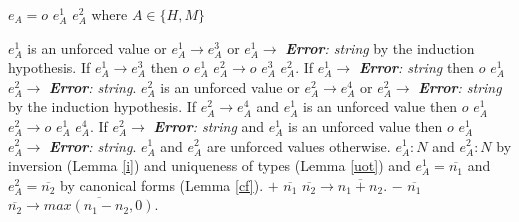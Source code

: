 \begin{case}

$e_{A}=o$ $e_{A}^{1}$ $e_{A}^{2}$ where $A\in\lbrace H,M\rbrace$

$e_{A}^{1}$ is an unforced value or $e_{A}^{1}\rightarrow e_{A}^{3}$ or $e_{A}^{1}\rightarrow$ \emph{\textbf{Error}: string} by the induction hypothesis.  If $e_{A}^{1}\rightarrow e_{A}^{3}$ then $o$ $e_{A}^{1}$ $e_{A}^{2}\rightarrow o$ $e_{A}^{3}$ $e_{A}^{2}$.  If $e_{A}^{1}\rightarrow$ \emph{\textbf{Error}: string} then $o$ $e_{A}^{1}$ $e_{A}^{2}\rightarrow$ \emph{\textbf{Error}: string}.  $e_{A}^{2}$ is an unforced value or $e_{A}^{2}\rightarrow e_{A}^{4}$ or $e_{A}^{2}\rightarrow$ \emph{\textbf{Error}: string} by the induction hypothesis.  If $e_{A}^{2}\rightarrow e_{A}^{4}$ and $e_{A}^{1}$ is an unforced value then $o$ $e_{A}^{1}$ $e_{A}^{2}\rightarrow o$ $e_{A}^{1}$ $e_{A}^{4}$.  If $e_{A}^{2}\rightarrow$ \emph{\textbf{Error}: string} and $e_{A}^{1}$ is an unforced value then $o$ $e_{A}^{1}$ $e_{A}^{2}\rightarrow$ \emph{\textbf{Error}: string}.  $e_{A}^{1}$ and $e_{A}^{2}$ are unforced values otherwise.  $e_{A}^{1}:N$ and $e_{A}^{2}:N$ by inversion (Lemma \ref{i}) and uniqueness of types (Lemma \ref{uot}) and $e_{A}^{1}=\overline{n_{1}}$ and $e_{A}^{2}=\overline{n_{2}}$ by canonical forms (Lemma \ref{cf}).  $+$ $\overline{n_{1}}$ $\overline{n_{2}}\rightarrow\overline{n_{1}+n_{2}}$.  $-$ $\overline{n_{1}}$ $\overline{n_{2}}\rightarrow\overline{max(n_{1}-n_{2},0)}$.

\end{case}